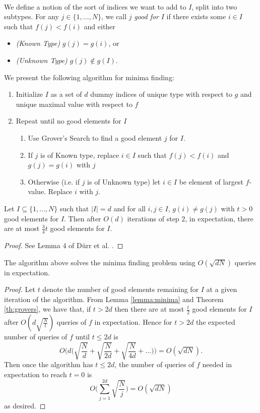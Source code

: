\paragraph{}
We define a notion of the sort of indices we want to add to $I$, split into two subtypes. For any $j \in \{1, \dots, N\}$, we call $j$ {\it good for} $I$ if there exists some $i \in I$ such that $f(j) < f(i)$ and either
\begin{itemize}
\item {\it(Known Type)} $g(j) = g(i)$, or 
\item {\it(Unknown Type)} $g(j) \not\in g(I)$.
\end{itemize}
We present the following algorithm for minima finding:
\begin{enumerate}
\item Initialize $I$ as a set of $d$ dummy indices of unique type with respect to $g$ and unique maximal value with respect to $f$
\item Repeat until no good elements for $I$
	\begin{enumerate}
	\item Use Grover's Search to find a good element $j$ for $I$.
	\item If $j$ is of Known type, replace $i \in I$ such that $f(j) < f(i)$ and $g(j) = g(i)$ with $j$
	\item Otherwise (i.e. if $j$ is of Unknown type) let $i \in I$ be element of largest $f$-value. Replace $i$ with $j$.
	\end{enumerate}
\end{enumerate}
\begin{lemma}\label{lemma:minima}Let $I \subseteq \{1,\dots, N\}$ such that $|I| = d$ and for all $i,j \in I$, $g(i) \neq g(j)$ with $t>0$ good elements for $I$. Then after $O(d)$ iterations of step $2$, in expectation, there are at most $\frac{3}{4}t$ good elements for $I$.
\end{lemma}
\begin{proof}
See Lemma $4$ of D{\"u}rr et al. \cite{durr2004quantum}.
\end{proof}
\begin{theorem}\label{th:minima}
The algorithm above solves the minima finding problem using $O(\sqrt{dN})$ queries in expectation.
\end{theorem}
\begin{proof}
Let $t$ denote the number of good elements remaining for $I$ at a given iteration of the algorithm. From Lemma \ref{lemma:minima} and Theorem \ref{th:grovers}, we have that, if $t > 2d$ then there are at most $\frac{t}{2}$ good elements for $I$ after $O(d\sqrt{\frac{N}{t}})$ queries of $f$ in expectation. Hence for $t>2d$ the expected number of queries of $f$ until $t\leq 2d$ is
$$O\big(d\big(\sqrt{\frac{N}{d}} + \sqrt{\frac{N}{2d}} + \sqrt{\frac{N}{4d}} + \dots\big)\big) = O(\sqrt{dN}).$$
Then once the algorithm has $t \leq 2d$, the number of queries of $f$ needed in expectation to reach $t=0$ is
$$O\big(\sum_{j=1}^{2d}\sqrt{\frac{N}{j}}\big) = O(\sqrt{dN})$$
as desired.
\end{proof}
